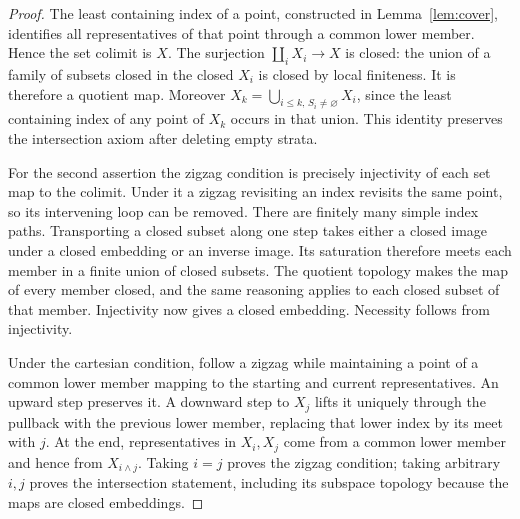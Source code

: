 \documentclass[11pt,a4paper]{article}
\theoremstyle{definition}
\begin{document}
\begin{proof}
The least containing index of a point, constructed in
Lemma~\ref{lem:cover}, identifies all representatives of that point
through a common lower member. Hence the set colimit is $X$. The
surjection $\coprod_iX_i\to X$ is closed: the union of a family of
subsets closed in the closed $X_i$ is closed by local finiteness.
It is therefore a quotient map. Moreover
$X_k=\bigcup_{i\leq k,\,S_i\ne\varnothing}X_i$, since the least
containing index of any point of $X_k$ occurs in that union. This
identity preserves the intersection axiom after deleting empty strata.

For the second assertion the zigzag condition is precisely injectivity
of each set map to the colimit. Under it a zigzag revisiting an index
revisits the same point, so its intervening loop can be removed.
There are finitely many simple index paths. Transporting a closed
subset along one step takes either a closed image under a closed
embedding or an inverse image. Its saturation therefore meets each
member in a finite union of closed subsets. The quotient topology
makes the map of every member closed, and the same reasoning applies
to each closed subset of that member. Injectivity now gives a closed
embedding. Necessity follows from injectivity.

Under the cartesian condition, follow a zigzag while maintaining a
point of a common lower member mapping to the starting and current
representatives. An upward step preserves it. A downward step to
$X_j$ lifts it uniquely through the pullback with the previous lower
member, replacing that lower index by its meet with $j$. At the end,
representatives in $X_i,X_j$ come from a common lower member and hence
from $X_{i\wedge j}$. Taking $i=j$ proves the zigzag condition; taking
arbitrary $i,j$ proves the intersection statement, including its
subspace topology because the maps are closed embeddings.
\end{proof}
\end{document}
